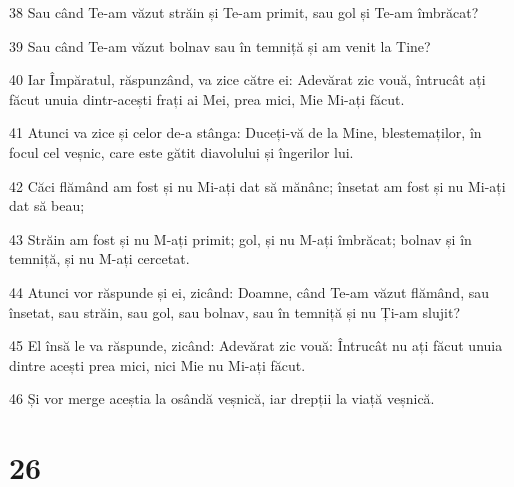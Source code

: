 \par 38 Sau când Te-am văzut străin și Te-am primit, sau gol și Te-am îmbrăcat?
\par 39 Sau când Te-am văzut bolnav sau în temniță și am venit la Tine?
\par 40 Iar Împăratul, răspunzând, va zice către ei: Adevărat zic vouă, întrucât ați făcut unuia dintr-acești frați ai Mei, prea mici, Mie Mi-ați făcut.
\par 41 Atunci va zice și celor de-a stânga: Duceți-vă de la Mine, blestemaților, în focul cel veșnic, care este gătit diavolului și îngerilor lui.
\par 42 Căci flămând am fost și nu Mi-ați dat să mănânc; însetat am fost și nu Mi-ați dat să beau;
\par 43 Străin am fost și nu M-ați primit; gol, și nu M-ați îmbrăcat; bolnav și în temniță, și nu M-ați cercetat.
\par 44 Atunci vor răspunde și ei, zicând: Doamne, când Te-am văzut flămând, sau însetat, sau străin, sau gol, sau bolnav, sau în temniță și nu Ți-am slujit?
\par 45 El însă le va răspunde, zicând: Adevărat zic vouă: Întrucât nu ați făcut unuia dintre acești prea mici, nici Mie nu Mi-ați făcut.
\par 46 Și vor merge aceștia la osândă veșnică, iar drepții la viață veșnică.

\chapter{26}

